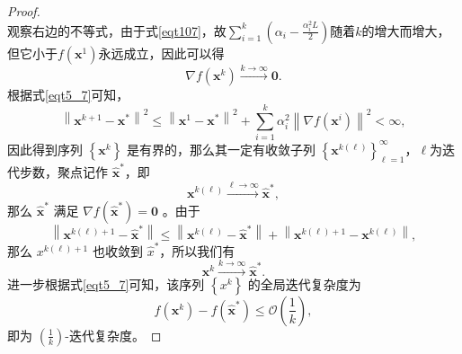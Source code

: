 \begin{proof}
\begin{equation}
        \nonumber
    \end{equation}
    观察右边的不等式，由于式\ref{eqt107}，故$\sum_{i=1}^{k}\left(\alpha_{i}-\frac{\alpha_{i}^{2} L}{2}\right)$随着$k$的增大而增大，但它小于$f\left(\bm{x}^{1}\right)$永远成立，因此可以得
    \begin{equation}
        \nabla f\left(\bm{x}^{k}\right) \stackrel{k \rightarrow \infty}{\longrightarrow} \mathbf{0} .
        \nonumber
    \end{equation}
    根据式\ref{eqt5_7}可知，
    \begin{equation}
        \left\|\bm{x}^{k+1}-\bm{x}^{*}\right\|^{2} \leq\left\|\bm{x}^{1}-\bm{x}^{*}\right\|^{2}+\sum_{i=1}^{k} \alpha_{i}^{2}\left\|\nabla f\left(\bm{x}^{i}\right)\right\|^{2}<\infty ,
        \nonumber
    \end{equation}
    因此得到序列 $\left\{\bm{x}^{k}\right\}$ 是有界的，那么其一定有收敛子列 $\left\{\bm{x}^{k(\ell)}\right\}_{\ell=1}^{\infty}$，$\ell$为迭代步数，聚点记作 $\hat{\bm{x}}^{*}$，即
    \begin{equation}
        \bm{x}^{k(\ell)} \stackrel{\ell \rightarrow \infty}{\longrightarrow} \hat{\bm{x}}^{*} ,
        \nonumber
    \end{equation}
    那么 $\hat{\bm{x}}^{*}$ 满足 $\nabla f\left(\hat{\bm{x}}^{*}\right)=\mathbf{0}$ 。由于
    \begin{equation}
        \left\|\bm{x}^{k(\ell)+1}-\hat{\bm{x}}^{*}\right\| \leq\left\|\bm{x}^{k(\ell)}-\hat{\bm{x}}^{*}\right\|+\left\|\bm{x}^{k(\ell)+1}-\bm{x}^{k(\ell)}\right\| ,
        \nonumber
    \end{equation}
    那么 $x^{k(\ell)+1}$ 也收敛到 $\hat{x}^{*}$，所以我们有
    \begin{equation}
        \bm{x}^{k} \stackrel{k \rightarrow \infty}{\longrightarrow} \hat{\bm{x}}^{*} .
        \nonumber
    \end{equation}
    进一步根据式\ref{eqt5_7}可知，该序列 $\left\{x^{k}\right\}$ 的全局迭代复杂度\cite{6302929}为
    \begin{equation}
        f\left(\bm{x}^{k}\right)-f\left(\hat{\bm{x}}^{*}\right) \leq \mathcal{O}\left(\frac{1}{k}\right),
        \nonumber
    \end{equation}
    即为 $\left(\frac{1}{k}\right)$-迭代复杂度。
\end{proof}

